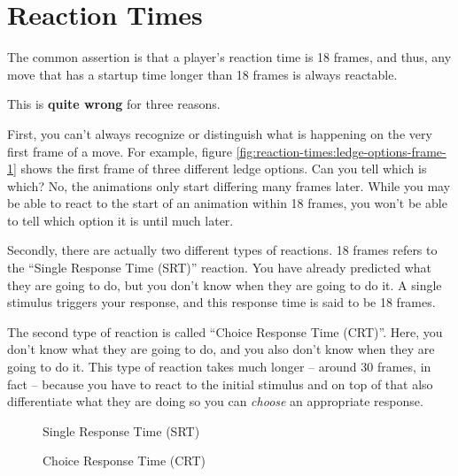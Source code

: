 \section{Reaction Times}
\label{sec:reaction-times}

The common assertion is that a player's reaction time is 18 frames, and thus, any move that has a startup time longer than 18 frames is always reactable.

This is \textbf{quite wrong} for three reasons.

First, you can't always recognize or distinguish what is happening on the very first frame of a move. For example, figure \ref{fig:reaction-times:ledge-options-frame-1} shows the first frame of three different ledge options. Can you tell which is which? No, the animations only start differing many frames later. While you may be able to react to the start of an animation within 18 frames, you won't be able to tell which option it is until much later.

Secondly, there are actually two different types of reactions. 18 frames refers to the ``Single Response Time (SRT)'' reaction. You have already predicted what they are going to do, but you don't know when they are going to do it. A single stimulus triggers your response, and this response time is said to be 18 frames.

The second type of reaction is called ``Choice Response Time (CRT)''. Here, you don't know what they are going to do, and you also don't know when they are going to do it. This type of reaction takes much longer -- around 30 frames, in fact -- because you have to react to the initial stimulus and on top of that also differentiate what they are doing so you can \emph{choose} an appropriate response.

\begin{figure}[ht]
    \centering
    \begin{subcaptionblock}[t]{0.48\linewidth}
        \caption{Single Response Time (SRT)}
    \end{subcaptionblock}
    \hfill
    \begin{subcaptionblock}[t]{0.48\linewidth}
        \caption{Choice Response Time (CRT)}
    \end{subcaptionblock}
\end{figure}
